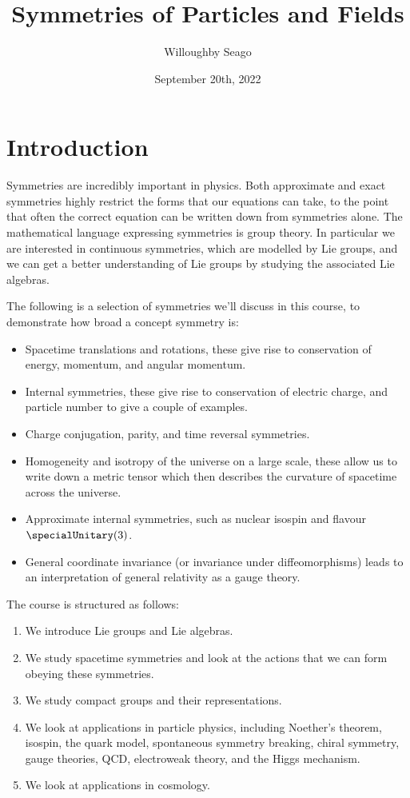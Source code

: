 \documentclass[fleqn]{NotesClass}
\title{Symmetries of Particles and Fields}
\author{Willoughby Seago}
\date{September 20th, 2022}
\begin{document}
    \frontmatter
    \titlepage
    \tableofcontents
    \mainmatter
    
    \chapter{Introduction}
    Symmetries are incredibly important in physics.
    Both approximate and exact symmetries highly restrict the forms that our equations can take, to the point that often the correct equation can be written down from symmetries alone.
    The mathematical language expressing symmetries is group theory.
    In particular we are interested in continuous symmetries, which are modelled by Lie groups, and we can get a better understanding of Lie groups by studying the associated Lie algebras.
    
    The following is a selection of symmetries we'll discuss in this course, to demonstrate how broad a concept symmetry is:
    \begin{itemize}
        \item Spacetime translations and rotations, these give rise to conservation of energy, momentum, and angular momentum.
        \item Internal symmetries, these give rise to conservation of electric charge, and particle number to give a couple of examples.
        \item Charge conjugation, parity, and time reversal symmetries.
        \item Homogeneity and isotropy of the universe on a large scale, these allow us to write down a metric tensor which then describes the curvature of spacetime across the universe.
        \item Approximate internal symmetries, such as nuclear isospin and flavour \(\specialUnitary(3)\).
        \item General coordinate invariance (or invariance under diffeomorphisms) leads to an interpretation of general relativity as a gauge theory.
    \end{itemize}
    
    The course is structured as follows:
    \begin{enumerate}
        \item We introduce Lie groups and Lie algebras.
        \item We study spacetime symmetries and look at the actions that we can form obeying these symmetries.
        \item We study compact groups and their representations.
        \item We look at applications in particle physics, including Noether's theorem, isospin, the quark model, spontaneous symmetry breaking, chiral symmetry, gauge theories, QCD, electroweak theory, and the Higgs mechanism.
        \item We look at applications in cosmology.
    \end{enumerate}
    
\end{document}
